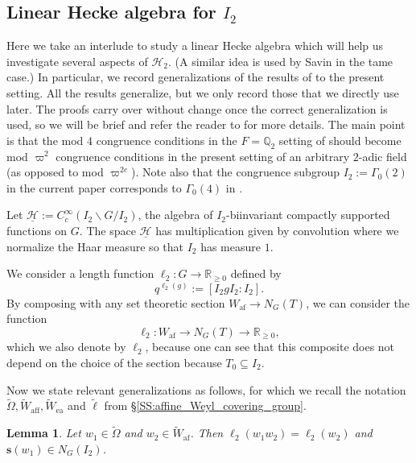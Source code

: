 \documentclass[10pt, letterpaper]{amsart}
\theoremstyle{plain}
\newtheorem{Lem}[equation]{Lemma}
\theoremstyle{definition}
\numberwithin{equation}{section}
\newcommand{\Wt}{\widetilde{W}}
\newcommand{\Omegat}{\widetilde{\Omega}}
\newcommand{\aff}{\mathrm{aff}}
\newcommand{\af}{\mathrm{af}}
\newcommand{\ea}{\mathrm{ea}}
\newcommand{\s}{\mathbf{s}}
\newcommand{\Hcal}{\mathcal{H}}
\begin{document}
\subsection{Linear Hecke algebra for $I_2$}\label{SS:LinearHecke}


Here we take an interlude to study a linear Hecke algebra which will help us investigate several aspects of $\Hcal_{2}$. (A similar idea is used by Savin \cite{S04} in the tame case.) In particular, we record generalizations of the results of \cite[Section 5]{Karasiewicz} to the present setting. All the results generalize, but we only record those that we directly use later. The proofs carry over without change once the correct generalization is used, so we will be brief and refer the reader to \cite[Section 5]{Karasiewicz} for more details. The main point is that the mod $4$ congruence conditions in the $F=\mathbb{Q}_{2}$ setting of \cite{Karasiewicz} should become mod $\varpi^{2}$ congruence conditions in the present setting of an arbitrary $2$-adic field (as opposed to mod $\varpi^{2e}$). Note also that the congruence subgroup $I_2:=\Gamma_{0}(2)$ in the current paper corresponds to $\Gamma_{0}(4)$ in \cite{Karasiewicz}.

Let $\underline{\Hcal}:=C_{c}^{\infty}(I_2\backslash G/I_2)$, the algebra of $I_2$-biinvariant compactly supported functions on $G$. The space $\underline{\Hcal}$ has multiplication given by convolution where we normalize the Haar measure so that $I_2$ has measure $1$. 

We consider a length function $\ell_{2}:G\rightarrow\mathbb{R}_{\geq 0}$ defined by
\begin{equation*}
	q^{\ell_{2}(g)}:=[I_2gI_2:I_2].
\end{equation*}
By composing with any set theoretic section $W_{\af}\rightarrow N_{G}(T)$, we can consider the function
\[
\ell_{2}:W_{\af}\rightarrow N_G(T)\rightarrow\mathbb{R}_{\geq 0},
\]
which we also denote by $\ell_2$, because one can see that this composite does not depend on the choice of the section because $T_{0}\subseteq  I_2$.

Now we state relevant generalizations as follows, for which we recall the notation $\Omegat, \Wt_{\aff}, \Wt_{\ea}$ and $\tilde{\ell}$ from \S \ref{SS:affine_Weyl_covering_group}.

\begin{Lem}\label{Len0elts}
    Let $w_{1}\in \Omegat$ and $w_{2}\in \widetilde{W}_{\af}$. Then $\ell_{2}(w_{1}w_{2})=\ell_{2}(w_{2})$ and $\s(w_{1})\in N_{G}( I_2)$.
\end{Lem}
\end{document}
